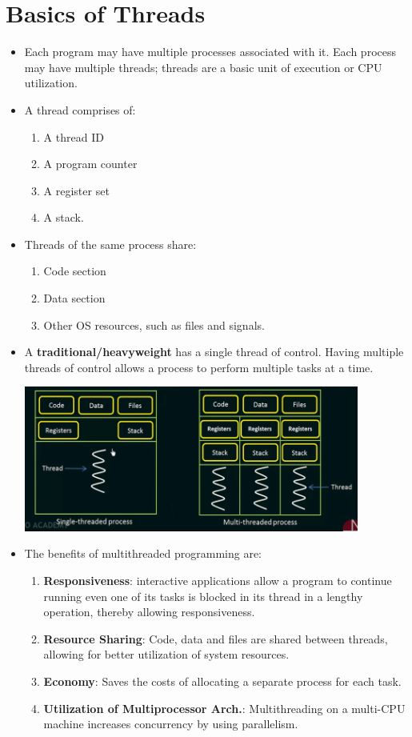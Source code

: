\documentclass[10pt]{report}
\begin{document}
\section{Basics of Threads}
\begin{itemize}
\item Each program may have multiple processes associated with it. Each process may have multiple threads; threads are a basic unit of execution or CPU utilization.
\item A thread comprises of:
\begin{enumerate}
\item A thread ID
\item A program counter
\item A register set
\item A stack.
\end{enumerate}
\item Threads of the same process share:
\begin{enumerate}
\item Code section
\item Data section
\item Other OS resources, such as files and signals.
\end{enumerate}
\item A \textbf{traditional/heavyweight} has a single thread of control. Having multiple threads of control allows a process to perform multiple tasks at a time.
\begin{center}
\includegraphics[width=11cm]{res/threads.png}
\end{center}
\item The benefits of multithreaded programming are:
\begin{enumerate}
\item \textbf{Responsiveness}: interactive applications allow a program to continue running even one of its tasks is blocked in its thread in a lengthy operation, thereby allowing responsiveness.
\item \textbf{Resource Sharing}: Code, data and files are shared between threads, allowing for better utilization of system resources.
\item \textbf{Economy}: Saves the costs of allocating a separate process for each task.
\item \textbf{Utilization of Multiprocessor Arch.}: Multithreading on a multi-CPU machine increases concurrency by using parallelism.
\end{enumerate}
\end{itemize}
\end{document}
